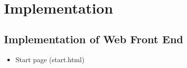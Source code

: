 \documentclass[a4paper,11pt]{article}
\begin{document}
\section{Implementation}
\subsection{Implementation of Web Front End}
\begin{itemize}
\item Start page (start.html)


\end{itemize}
\end{document}

